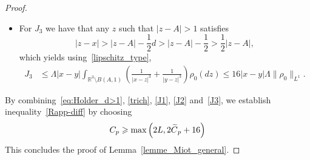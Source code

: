 \documentclass[10pt]{amsart}
\theoremstyle{definition}\newtheorem{defi}[theo]{Definition}\newtheorem{rema}[theo]{Remark}\newtheorem{exam}[theo]{Example}\newtheorem{exem}[theo]{Example}\newtheorem{nota}[theo]{Notation}
\newcommand{\R}{\mathbb{R}}
\renewcommand{\leq}{\leqslant}
\renewcommand{\geq}{\geqslant}
\let\oldtilde\tilde
\renewcommand*{\tilde}[1]{\mathchoice{\widetilde{#1}}{\widetilde{#1}}{\oldtilde{#1}}{\oldtilde{#1}}}
\begin{document}
\begin{proof}
\begin{itemize}
\item For $J_3$ we have that any $z$ such that $|z-A|>1$ satisfies
\[
|z-x|>|z-A|- \frac{1}{2} d>|z-A|- \frac{1}{2} > \frac{1}{2} |z-A|,
\]
which yields using~\eqref{lipschitz_type},
\begin{align}\label{J3}
J_3 &\leq \Lambda |x-y| \int_{\R^3\setminus B(A,1)}\left(\frac{1}{|x-z|^3}+\frac{1}{|y-z|^3} \right)\rho_0(dz)\leq 16|x-y|\Lambda \|\rho_0\|_{L^1}.
\end{align}
\end{itemize}
By combining~\eqref{eq:Holder_d>1}, \eqref{trich}, \eqref{J1}, \eqref{J2} and~\eqref{J3}, we establish inequality~\eqref{Rapp-diff} by choosing
\[
C_p \geq \max\left(2L, 2\tilde{C}_p+16\right)
\]
This concludes the proof of Lemma~\ref{lemme_Miot_general}.
\end{proof}
\end{document}

